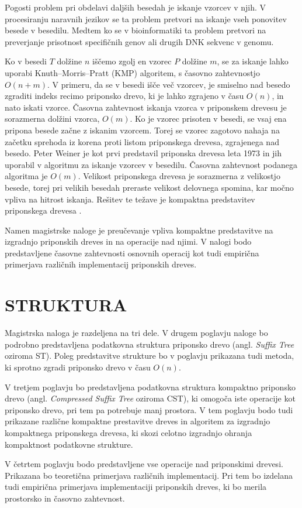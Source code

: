 Pogosti problem pri obdelavi daljših besedah je iskanje vzorcev v njih. V procesiranju naravnih jezikov se ta problem pretvori na iskanje vseh ponovitev besede v besedilu. Medtem ko se v bioinformatiki ta problem pretvori na preverjanje prisotnost specifičnih genov ali drugih DNK sekvenc v genomu. 

Ko v besedi $T$ dolžine $n$ iščemo zgolj en vzorec $P$ dolžine $m$, se za iskanje lahko uporabi Knuth–Morris–Pratt (KMP) algoritem, s časovno zahtevnostjo $O(n+m)$.  V primeru, da se v besedi išče več vzorcev, je smiselno nad besedo zgraditi indeks recimo priponsko drevo, ki je lahko zgrajeno v času $O(n)$, in nato iskati vzorce. Časovna zahtevnost iskanja vzorca v priponskem drevesu je sorazmerna dolžini vzorca, $O(m)$. Ko je vzorec prisoten v besedi, se vsaj ena pripona besede začne z iskanim vzorcem. 
Torej se vzorec zagotovo nahaja na začetku sprehoda iz korena proti listom priponskega drevesa, zgrajenega nad besedo. 
Peter Weiner je kot prvi predstavil priponska drevesa leta 1973 \cite{Weiner1973} in jih uporabil v algoritmu za iskanje vzorcev v besedilu. Časovna zahtevnost podanega algoritma je $O(m)$. Velikost priponskega drevesa je sorazmerna z velikostjo besede, torej pri velikih besedah preraste velikost delovnega spomina, kar močno vpliva na hitrost iskanja. Rešitev te težave je kompaktna predstavitev priponskega drevesa \cite{Navarro2016}.

Namen magistrske naloge je preučevanje vpliva kompaktne predstavitve na izgradnjo priponskih dreves in na operacije nad njimi. V nalogi bodo predstavljene  časovne zahtevnosti osnovnih operacij kot tudi empirična primerjava različnih implementacij priponskih dreves.

\section{STRUKTURA}\label{sec:struktura}

Magistrska naloga je razdeljena na tri dele. V drugem poglavju naloge bo podrobno predstavljena podatkovna struktura priponsko drevo (angl. \textit{Suffix Tree} oziroma ST). Poleg predstavitve strukture bo v poglavju prikazana tudi metoda, ki sprotno zgradi priponsko drevo v času $O(n)$.


V tretjem poglavju bo predstavljena podatkovna struktura kompaktno priponsko drevo (angl. \textit{Compressed Suffix Tree} oziroma CST), ki omogoča iste operacije kot priponsko drevo, pri tem pa potrebuje manj prostora. V tem poglavju bodo tudi prikazane različne kompaktne prestavitve dreves in algoritem za izgradnjo kompaktnega priponskega drevesa, ki skozi celotno izgradnjo ohranja kompaktnost podatkovne strukture.

V četrtem poglavju bodo predstavljene vse operacije nad priponskimi drevesi. Prikazana bo teoretična primerjava različnih implementacij. Pri tem bo izdelana tudi empirična primerjava implementaciji priponskih dreves, ki bo merila prostorsko in časovno zahtevnost.